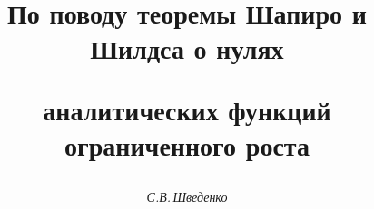 

 


% 


\newcommand{\tg}{\operatorname{tg}} 


\newcommand{\tts}[1]{} 


 




\setcounter{page}{75} 












 


\author{\it С.В.\,Шведенко} 




\title{По поводу теоремы Шапиро и Шилдса о нулях  


аналитических функций ограниченного роста} 


 


\date{} 




\pagestyle{plain} %


 




\maketitle 


\label{begin} 


